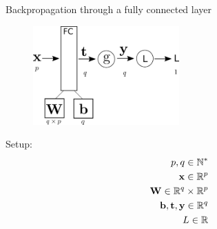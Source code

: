\documentclass[xcolor=pdftex,dvipsnames,table,mathserif]{beamer}
\begin{document}




\begin{frame}{Backpropagation through a fully connected layer}
\begin{figure}
\includegraphics[width=0.5\textwidth]{bp_fc.png}
\end{figure}

Setup:
\begin{eqnarray*}
p, q \in \mathbb{N}^*\\
\mathbf{x} \in \mathbb{R}^p \\
\mathbf{W} \in \mathbb{R}^q \times \mathbb{R}^p \\
\mathbf{b}, \mathbf{t}, \mathbf{y} \in \mathbb{R}^q \\
L \in \mathbb{R}
\end{eqnarray*}

\end{frame}
\end{document}
